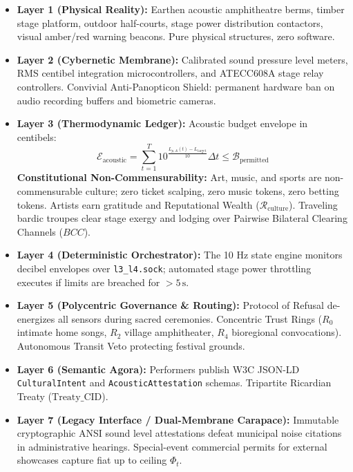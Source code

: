 \begin{itemize}
    \item \textbf{Layer 1 (Physical Reality):} Earthen acoustic amphitheatre berms, timber stage platform, outdoor half-courts, stage power distribution contactors, visual amber/red warning beacons. Pure physical structures, zero software.
    \item \textbf{Layer 2 (Cybernetic Membrane):} Calibrated sound pressure level meters, RMS centibel integration microcontrollers, and ATECC608A stage relay controllers. Convivial Anti-Panopticon Shield: permanent hardware ban on audio recording buffers and biometric cameras.
    \item \textbf{Layer 3 (Thermodynamic Ledger):} Acoustic budget envelope in centibels:
    \[
    \mathcal{E}_{\mathrm{acoustic}} = \sum_{t=1}^{T} 10^{\frac{L_{p,A}(t) - L_{\mathrm{target}}}{10}} \Delta t \le \mathcal{B}_{\mathrm{permitted}}
    \]
    \textbf{Constitutional Non-Commensurability:} Art, music, and sports are non-commensurable culture; zero ticket scalping, zero music tokens, zero betting tokens. Artists earn gratitude and Reputational Wealth ($\mathcal{R}_{\mathrm{culture}}$). Traveling bardic troupes clear stage exergy and lodging over Pairwise Bilateral Clearing Channels ($BCC$).
    \item \textbf{Layer 4 (Deterministic Orchestrator):} The 10 Hz state engine monitors decibel envelopes over \texttt{l3\_l4.sock}; automated stage power throttling executes if limits are breached for $>5\,\mathrm{s}$.
    \item \textbf{Layer 5 (Polycentric Governance \& Routing):} Protocol of Refusal de-energizes all sensors during sacred ceremonies. Concentric Trust Rings ($R_0$ intimate home songs, $R_2$ village amphitheater, $R_4$ bioregional convocations). Autonomous Transit Veto protecting festival grounds.
    \item \textbf{Layer 6 (Semantic Agora):} Performers publish W3C JSON-LD \texttt{CulturalIntent} and \texttt{AcousticAttestation} schemas. Tripartite Ricardian Treaty ($\mathrm{Treaty\_CID}$).
    \item \textbf{Layer 7 (Legacy Interface / Dual-Membrane Carapace):} Immutable cryptographic ANSI sound level attestations defeat municipal noise citations in administrative hearings. Special-event commercial permits for external showcases capture fiat up to ceiling $\Phi_t$.
\end{itemize}

